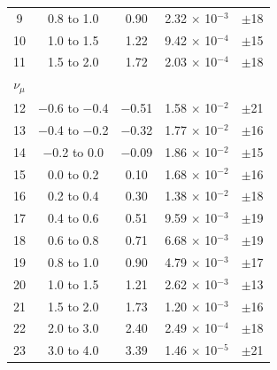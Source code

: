 \begin{table}[p]
\begin{tabular}{ccccc}
		9               & 0.8 to 1.0       & 0.90                      & 2.32 $\times$ 10$^{-\text{3}}$                & $\pm$18 \\
		10              & 1.0 to 1.5       & 1.22                      & 9.42 $\times$ 10$^{-\text{4}}$                & $\pm$15 \\
		11              & 1.5 to 2.0       & 1.72                      & 2.03 $\times$ 10$^{-\text{4}}$                & $\pm$18 \\
		$\nu_{\mu}$     &                  &                           &                                               &         \\
		12              & $-$0.6 to $-$0.4 & $-$0.51                   & 1.58 $\times$ 10$^{-\text{2}}$                & $\pm$21 \\
		13              & $-$0.4 to $-$0.2 & $-$0.32                   & 1.77 $\times$ 10$^{-\text{2}}$                & $\pm$16 \\
		14              & $-$0.2 to 0.0    & $-$0.09                   & 1.86 $\times$ 10$^{-\text{2}}$                & $\pm$15 \\
		15              & 0.0 to 0.2       & 0.10                      & 1.68 $\times$ 10$^{-\text{2}}$                & $\pm$16 \\
		16              & 0.2 to 0.4       & 0.30                      & 1.38 $\times$ 10$^{-\text{2}}$                & $\pm$18 \\
		17              & 0.4 to 0.6       & 0.51                      & 9.59 $\times$ 10$^{-\text{3}}$                & $\pm$19 \\
		18              & 0.6 to 0.8       & 0.71                      & 6.68 $\times$ 10$^{-\text{3}}$                & $\pm$19 \\
		19              & 0.8 to 1.0       & 0.90                      & 4.79 $\times$ 10$^{-\text{3}}$                & $\pm$17 \\
		20              & 1.0 to 1.5       & 1.21                      & 2.62 $\times$ 10$^{-\text{3}}$                & $\pm$13 \\
		21              & 1.5 to 2.0       & 1.73                      & 1.20 $\times$ 10$^{-\text{3}}$                & $\pm$16 \\
		22              & 2.0 to 3.0       & 2.40                      & 2.49 $\times$ 10$^{-\text{4}}$                & $\pm$18 \\
		23              & 3.0 to 4.0       & 3.39                      & 1.46 $\times$ 10$^{-\text{5}}$                & $\pm$21 \\ \hline \hline
	\end{tabular}
\end{table}

